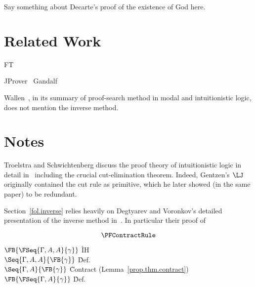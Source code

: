 \begin{remark}
  Say something about Decarte's proof of the existence of God here.
\end{remark}

\section{Related Work}
FT~\cite{Sahlin.1992.FT}
\cite{Sahlin.1989.SICS}

JProver~\cite{Schmitt.2001.IJCAR}
Gandalf~\cite{Tammet.1996.CADE}

Wallen~\cite{Wallen.1990.Book}, in its summary of
proof-search method in modal and intuitionistic logic, does not mention the
inverse method.
\cite{Shankar.1992.CADE}

\section{Notes}

Troelstra and Schwichtenberg discuss the proof theory of intuitionistic
logic in detail in~\cite{Troelstra.2000.ProofTheory} including the
crucial cut-elimination theorem.  Indeed, Gentzen's $\LJ$ originally
contained the cut rule as primitive, which he later showed (in the same
paper) to be redundant.

Section~\ref{fol.inverse} relies heavily on Degtyarev and Voronkov's detailed
presentation of the inverse method in~\cite{Voronkov.2001.Handbook}.  In
particular their proof of \cite{Lifschitz.1989.JAR}
  \item[Case:]
    \[ \PFContractRule \]
    \begin{tabbing}
      $\FB{\FSeq{\Gamma,A,A}{\gamma}}$ \` IH \\
      $\Seq{\Gamma, A, A}{\FB{\gamma}}$ \` Def. \\
      $\Seq{\Gamma, A}{\FB{\gamma}}$ \` Contract (Lemma~\ref{prop.thm.contract})\\
      $\FB{\FSeq{\Gamma,A}{\gamma}}$ \` Def. \\
    \end{tabbing}

